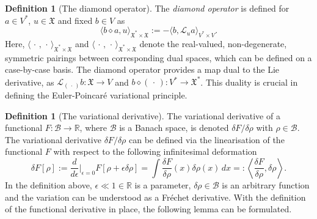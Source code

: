 \documentclass[11pt, oneside]{article}   	%
\numberwithin{equation}{section}
\theoremstyle{plain}
\theoremstyle{definition}
\newtheorem{definition}[theorem]{Definition}
\theoremstyle{remark}
\newcommand{\<}{\langle}
\renewcommand{\>}{\rangle}
\begin{document}
\begin{definition}[The diamond operator]
The \emph{diamond operator} is defined for $a\in V^*$, $u\in\mathfrak{X}$ and fixed $b\in V$ as
\begin{equation}
\langle b\diamond a, u\rangle_{\mathfrak{X}^{*}\times\mathfrak{X}} := -\langle b,\mathcal{L}_u a\rangle_{V^*\times V}.
\end{equation}
Here, $\langle\,\cdot\,,\,\cdot\,\rangle_{\mathfrak{X}^{*}\times\mathfrak{X}}$ and  $\langle\,\cdot\,,\,\cdot\,\rangle_{\mathfrak{X}^{*}\times\mathfrak{X}}$ denote the real-valued, non-degenerate, symmetric pairings between corresponding dual spaces, which can be defined on a case-by-case basis. 
The diamond operator provides a map dual to the Lie derivative, as $\mathcal{L}_{(\,\cdot\,)}b:\mathfrak{X}\to V$ and $b\diamond(\,\cdot\,):V^*\to\mathfrak{X}^{*}$. This duality is crucial in defining the  Euler-Poincar\'e variational principle.
\end{definition}


\begin{definition}[The variational derivative] The variational derivative of a functional $F:\mathcal{B}\to\mathbb{R}$, where $\mathcal{B}$ is a Banach space, is denoted $\delta F/\delta \rho$ with $\rho\in\mathcal{B}$. The variational derivative $\delta F/\delta \rho$ can be defined via the linearisation of the functional $F$ with respect to the following infinitesimal deformation 
\begin{equation}
\delta F[\rho]:= \frac{d}{d\epsilon}\Big|_{\epsilon=0} F[\rho+\epsilon \delta\rho] = \int \frac{\delta F}{\delta \rho}(x)\delta\rho(x)\,dx =: \left\langle\frac{\delta F}{\delta \rho},\delta \rho\right\rangle.
\end{equation}
In the definition above, $\epsilon\ll1\in\mathbb{R}$ is a parameter, $\delta\rho\in\mathcal{B}$ is an arbitrary function and the  variation can be understood as a Fr\'echet derivative. With the definition of the functional derivative in place, the following lemma can be formulated.
\end{definition}
\end{document}
